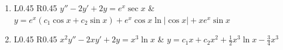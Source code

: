 \documentclass[a4paper,12pt]{article}
\begin{document}
\begin{enumerate}
    \item
    \begin{tabularx}{\linewidth}{L{0.45\linewidth} R{0.45\linewidth}}
    \( y'' - 2y' + 2y = e^x \sec x \) & \(\displaystyle y = e^x(c_1 \cos x + c_2 \sin x) + e^x \cos x \ln|\cos x| + x e^x \sin x \)
    \end{tabularx}

    \item
    \begin{tabularx}{\linewidth}{L{0.45\linewidth} R{0.45\linewidth}}
    \( x^2 y'' - 2x y' + 2y = x^3 \ln x \) & \(\displaystyle y = c_1 x + c_2 x^2 + \frac{1}{2} x^3 \ln x - \frac{3}{4} x^3 \)
    \end{tabularx}
    
\end{enumerate}
\end{document}
